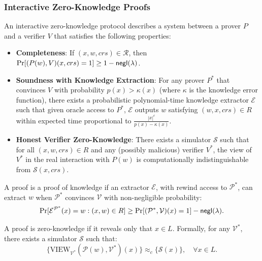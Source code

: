 \subsubsection{Interactive Zero-Knowledge Proofs}
\begin{definition}
    An interactive zero-knowledge protocol describes a system between a prover $P$ and a verifier $V$ that satisfies the following properties:

\begin{itemize}
    \item \textbf{Completeness}: If $(x,w,crs) \in \mathcal{R}$, then $\Pr[(P(w), V)(x, crs) = 1] \geq 1 - \mathsf{negl}(\lambda)$.
    
    \item \textbf{Soundness with Knowledge Extraction}: For any prover $P^*$ that convinces $V$ with probability $p(x) > \kappa(x)$ (where $\kappa$ is the knowledge error function), there exists a probabilistic polynomial-time knowledge extractor $\mathcal{E}$ such that given oracle access to $P^*$, $\mathcal{E}$ outputs $w$ satisfying $(w,x,crs) \in R$ within expected time proportional to $\frac{|x|^c}{p(x)-\kappa(x)}$.
    
    \item \textbf{Honest Verifier Zero-Knowledge}: There exists a simulator $\mathcal{S}$ such that for all $(x,w,crs) \in R$ and any (possibly malicious) verifier $V^*$, the view of $V^*$ in the real interaction with $P(w)$ is computationally indistinguishable from $\mathcal{S}(x,crs)$.
\end{itemize}
\end{definition}

\begin{remark}[Extractor]
    A proof is a proof of knowledge if an extractor $\mathcal{E}$, with rewind access to $\mathcal{P}^*$, can extract $w$ when $\mathcal{P}^*$ convinces $\mathcal{V}$ with non-negligible probability:
\[
\Pr[\mathcal{E}^{\mathcal{P}^*}(x) = w : (x, w) \in R] \geq \Pr[(\mathcal{P}^*, \mathcal{V})(x) = 1] - \mathsf{negl}(\lambda).
\]
\end{remark}

\begin{remark}
A proof is zero-knowledge if it reveals only that $x \in L$. Formally, for any $\mathcal{V}^*$, there exists a simulator $\mathcal{S}$ such that:
\[
\{\text{VIEW}_{\mathcal{V}^*}(\mathcal{P}(w), \mathcal{V}^*)(x)\} \approx_c \{\mathcal{S}(x)\}, \quad \forall x \in L.
\]    
\end{remark}


